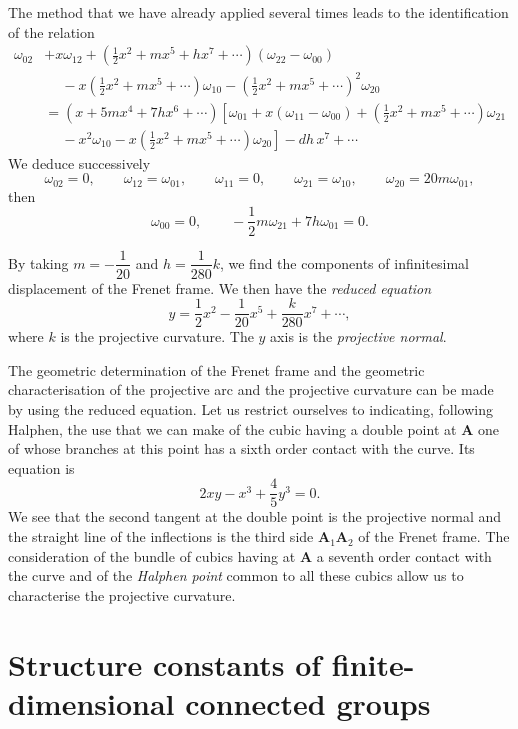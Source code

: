 \documentclass[leqno,11pt]{book}
\numberwithin{equation}{chapter}
\theoremstyle{shape1}
\theoremstyle{shapesmall}
\begin{document}
The method that we have already applied several times leads to the identification of the relation
\begin{align*}
  \omega_{02}&+ x\omega_{12}+\left(\frac{1}{2} x^{2}+mx^{5}+hx^{7}+\cdots\right)(\omega_{22}-\omega_{00})\\
  &\phantom{+}{}-{}x\left(\frac{1}{2}x^{2}+mx^{5}+\cdots\right)\omega_{10}-\left(\frac{1}{2}x^{2}+mx^{5}+\cdots\right)^{2}\omega_{20}\\
    &=(x+5mx^{4}+7hx^{6}+\cdots)\left[\omega_{01}+x(\omega_{11}-\omega_{00})+\left(\frac{1}{2}x^{2}+mx^{5}+\cdots\right)\omega_{21}\right.\\
    &\phantom{+}-\left. x^{2}\omega_{10}-x\left(\frac{1}{2}x^{2}+mx^{5}+\cdots\right)\omega_{20}\right]-dh\,x^{7}+\cdots
\end{align*}
We deduce successively
\[
\omega_{02}=0,\qquad\omega_{12}=\omega_{01},\qquad\omega_{11}=0,\qquad\omega_{21}=\omega_{10},\qquad\omega_{20}=20 m\omega_{01},
\]
then
\[
\omega_{00}=0,\qquad-\frac{1}{2}m\omega_{21}+7h\omega_{01}=0.
\]

By taking $m=-\dfrac{1}{20}$ and $h=\dfrac{1}{280}k$, we find the components of infinitesimal displacement of the Frenet frame. We then have the \emph{reduced equation}
\[
y=\frac{1}{2}x^{2}-\frac{1}{20} x^{5}+\frac{k}{280} x^{7}+\cdots,
\]
where $k$ is the projective curvature. The $y$ axis is the \emph{projective normal}.

The geometric determination of the Frenet frame and the geometric characterisation of the projective arc and the projective curvature can be made by using the reduced equation. Let us restrict ourselves to indicating, following Halphen, the use that we can make of the cubic having a double point at $\mathbf{A}$ one of whose branches at this point has a sixth order contact  with the curve. Its equation is
\[
2xy-x^{3}+\frac{4}{5}y^{3}=0.
\]
We see that the second tangent at the double point is the projective normal and the straight line of the inflections is the third side $\mathbf{A}_{1}\mathbf{A}_{2}$ of the Frenet frame. The consideration of the bundle of cubics having at $\mathbf{A}$ a seventh order contact with the curve and of the \emph{Halphen point} common to all these cubics allow us to characterise the projective curvature.


\part{Structure constants of finite-dimensional connected groups}
\label{part:struct-const-finite}
\end{document}
